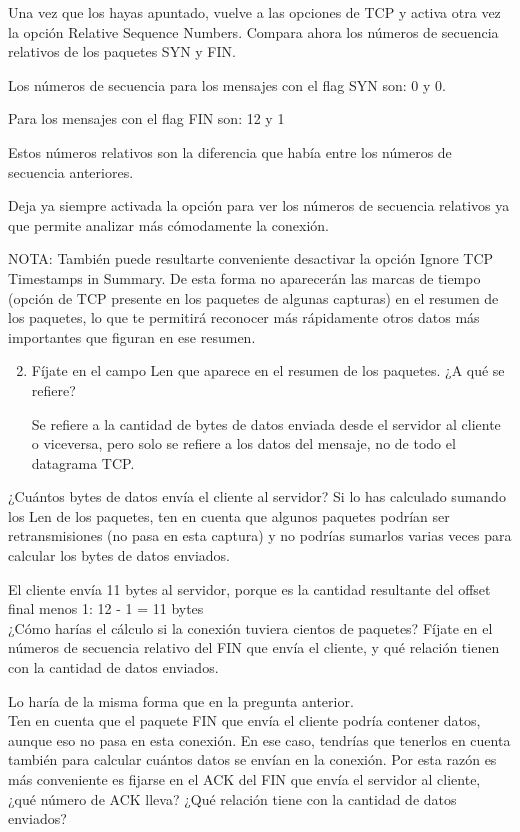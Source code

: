 \documentclass[12pt, a4paper]{report}
\begin{document}
Una vez que los hayas apuntado, vuelve a las opciones de TCP y activa otra vez la opción Relative Sequence Numbers. Compara ahora los números de secuencia relativos de los paquetes SYN y FIN.

Los números de secuencia para los mensajes con el flag SYN son: 0 y 0.

Para los mensajes con el flag FIN son: 12 y 1

Estos números relativos son la diferencia que había entre los números de secuencia anteriores.

Deja ya siempre activada la opción para ver los números de secuencia relativos ya que permite analizar más cómodamente la conexión.

NOTA: También puede resultarte conveniente desactivar la opción Ignore TCP Timestamps in Summary. De esta forma no aparecerán las marcas de tiempo (opción de TCP presente en los paquetes de algunas capturas) en el resumen de los paquetes, lo que te permitirá reconocer más rápidamente otros datos más importantes que figuran en ese resumen.

\begin{enumerate}
	\setcounter{enumi}{1}
	\item Fíjate en el campo Len que aparece en el resumen de los paquetes. ¿A qué se refiere?
	
	Se refiere a la cantidad de bytes de datos enviada desde el servidor al cliente o viceversa, pero solo se refiere a los datos del mensaje, no de todo el datagrama TCP.
\end{enumerate}

¿Cuántos bytes de datos envía el cliente al servidor? Si lo has calculado sumando los Len de los paquetes, ten en cuenta que algunos paquetes podrían ser retransmisiones (no pasa en esta captura) y no podrías sumarlos varias veces para calcular los bytes de datos enviados.

El cliente envía 11 bytes al servidor, porque es la cantidad resultante del offset final menos 1: 12 - 1 = 11 bytes\\

¿Cómo harías el cálculo si la conexión tuviera cientos de paquetes? Fíjate en el números de secuencia relativo del FIN que envía el cliente, y qué relación tienen con la cantidad de datos enviados.

Lo haría de la misma forma que en la pregunta anterior.\\


Ten en cuenta que el paquete FIN que envía el cliente podría contener datos, aunque eso no pasa en esta conexión. En ese caso, tendrías que tenerlos en cuenta también para calcular cuántos datos se envían en la conexión. Por esta razón es más conveniente es fijarse en el ACK del FIN que envía el servidor al cliente, ¿qué número de ACK lleva? ¿Qué relación tiene con la cantidad de datos enviados?
\end{document}
